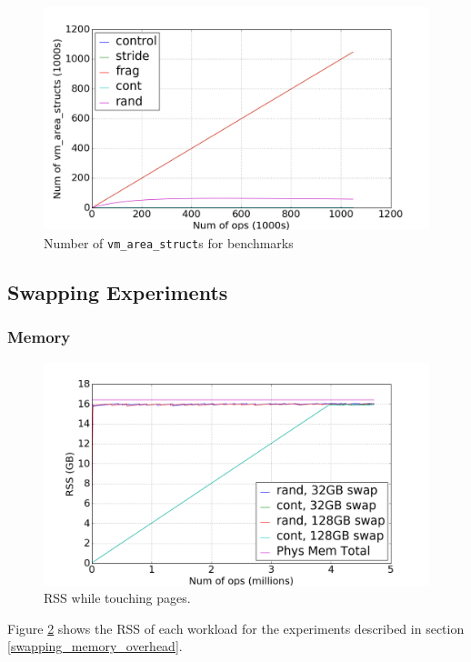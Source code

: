 \documentclass[twocolumn,11pt]{article}
\begin{document}
\begin{figure}[t]
    \includegraphics[width=\columnwidth]{figures/vm_area_struct_count}
    \caption{Number of \texttt{vm\_area\_struct}s for benchmarks}
    \label{fig:vm_area_struct_count}
\end{figure}


\subsection{Swapping Experiments}

\subsubsection{Memory}

\begin{figure}[t]
    \includegraphics[width=\columnwidth]{figures/swap_rss}
    \caption{RSS while touching pages.  \label{fig:swap_rss}}
\end{figure}

Figure \ref{fig:swap_rss} shows the RSS of each workload for the
experiments described in section \ref{swapping_memory_overhead}. 
\end{document}
